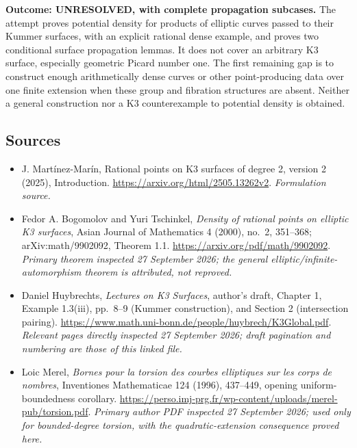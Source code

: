 \documentclass[11pt]{article}
\begin{document}
\textbf{Outcome: UNRESOLVED, with complete propagation subcases.}
The attempt proves potential density for products of elliptic curves
passed to their Kummer surfaces, with an explicit rational dense example,
and proves two conditional surface propagation lemmas. It does not cover
an arbitrary K3 surface, especially geometric Picard number one. The first
remaining gap is to construct enough arithmetically dense curves or other
point-producing data over one finite extension when these group and
fibration structures are absent. Neither a general construction nor a
K3 counterexample to potential density is obtained.

\subsection{Sources}
\begin{itemize}
\item[S1]J. Martínez-Marín, Rational points on K3 surfaces of degree 2, version 2 (2025), Introduction.
\url{https://arxiv.org/html/2505.13262v2}.
\textit{Formulation source.}
\item[E1]Fedor A. Bogomolov and Yuri Tschinkel,
\emph{Density of rational points on elliptic K3 surfaces},
Asian Journal of Mathematics 4 (2000), no.~2, 351--368;
arXiv:math/9902092, Theorem 1.1.
\url{https://arxiv.org/pdf/math/9902092}.
\textit{Primary theorem inspected 27 September 2026; the general
elliptic/infinite-automorphism theorem is attributed, not reproved.}
\item[E2]Daniel Huybrechts, \emph{Lectures on K3 Surfaces},
author's draft, Chapter 1, Example 1.3(iii), pp.~8--9
(Kummer construction), and Section 2 (intersection pairing).
\url{https://www.math.uni-bonn.de/people/huybrech/K3Global.pdf}.
\textit{Relevant pages directly inspected 27 September 2026;
draft pagination and numbering are those of this linked file.}
\item[E3]Loic Merel, \emph{Bornes pour la torsion des courbes elliptiques
sur les corps de nombres}, Inventiones Mathematicae 124 (1996), 437--449,
opening uniform-boundedness corollary.
\url{https://perso.imj-prg.fr/wp-content/uploads/merel-pub/torsion.pdf}.
\textit{Primary author PDF inspected 27 September 2026; used only for
bounded-degree torsion, with the quadratic-extension consequence proved here.}
\end{itemize}
\end{document}
